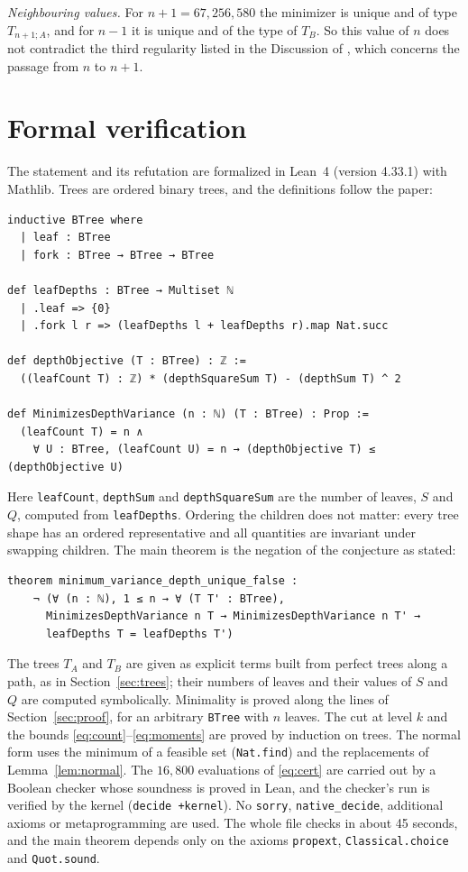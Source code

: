\documentclass[11pt]{amsart}
\theoremstyle{remark}
\begin{document}
\emph{Neighbouring values.} For $n+1=67{,}256{,}580$ the minimizer is unique and of type $T_{n+1;A}$, and for $n-1$ it is unique and of the type of $T_B$.
So this value of $n$ does not contradict the third regularity listed in the Discussion of \cite{CMRR}, which concerns the passage from $n$ to $n+1$.

\section{Formal verification}\label{sec:lean}

The statement and its refutation are formalized in Lean~4 (version 4.33.1) with Mathlib.
Trees are ordered binary trees, and the definitions follow the paper:
\begin{Verbatim}[fontsize=\small,frame=single]
inductive BTree where
  | leaf : BTree
  | fork : BTree → BTree → BTree

def leafDepths : BTree → Multiset ℕ
  | .leaf => {0}
  | .fork l r => (leafDepths l + leafDepths r).map Nat.succ

def depthObjective (T : BTree) : ℤ :=
  ((leafCount T) : ℤ) * (depthSquareSum T) - (depthSum T) ^ 2

def MinimizesDepthVariance (n : ℕ) (T : BTree) : Prop :=
  (leafCount T) = n ∧
    ∀ U : BTree, (leafCount U) = n → (depthObjective T) ≤ (depthObjective U)
\end{Verbatim}
Here \texttt{leafCount}, \texttt{depthSum} and \texttt{depthSquareSum} are the number of leaves, $S$ and $Q$, computed from \texttt{leafDepths}.
Ordering the children does not matter: every tree shape has an ordered representative and all quantities are invariant under swapping children.
The main theorem is the negation of the conjecture as stated:
\begin{Verbatim}[fontsize=\small,frame=single]
theorem minimum_variance_depth_unique_false :
    ¬ (∀ (n : ℕ), 1 ≤ n → ∀ (T T' : BTree),
      MinimizesDepthVariance n T → MinimizesDepthVariance n T' →
      leafDepths T = leafDepths T')
\end{Verbatim}
The trees $T_A$ and $T_B$ are given as explicit terms built from perfect trees along a path, as in Section~\ref{sec:trees}; their numbers of leaves and their values of $S$ and $Q$ are computed symbolically.
Minimality is proved along the lines of Section~\ref{sec:proof}, for an arbitrary \texttt{BTree} with $n$ leaves.
The cut at level $k$ and the bounds \eqref{eq:count}--\eqref{eq:moments} are proved by induction on trees.
The normal form uses the minimum of a feasible set (\texttt{Nat.find}) and the replacements of Lemma~\ref{lem:normal}.
The $16{,}800$ evaluations of \eqref{eq:cert} are carried out by a Boolean checker whose soundness is proved in Lean, and the checker's run is verified by the kernel (\texttt{decide +kernel}).
No \texttt{sorry}, \texttt{native\_decide}, additional axioms or metaprogramming are used.
The whole file checks in about 45 seconds, and the main theorem depends only on the axioms \texttt{propext}, \texttt{Classical.choice} and \texttt{Quot.sound}.
\end{document}

